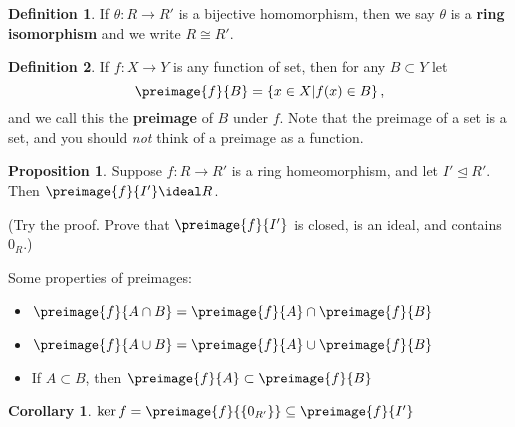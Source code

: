 \documentclass[a5paper]{article}
\theoremstyle{definition}%
\newtheorem*{corollary*}{Corollary}
\newtheorem*{proposition*}{Proposition}
\newtheorem*{definition*}{Definition}
\numberwithin{exercise}{section}
\theoremstyle{remark}%
\begin{document}
\begin{highlight}
\begin{definition*}
If $\theta:R\to R'$ is a bijective homomorphism, then we say $\theta$ is a \textbf{ring isomorphism} and we write $R\cong R'$. 
\end{definition*}
\end{highlight}

\begin{highlight}
\begin{definition*}
If $f:X \to Y$ is any function of set, then for any $B\subset Y$ let 
$$\preimage{f}{B}=\left\lbrace x \in X | f(x)\in B\right \rbrace,$$
and we call this the \textbf{preimage} of $B$ under $f$. Note that the preimage of a set is a set, and you should \emph{not} think of a preimage as a function. 
\end{definition*}
\end{highlight}

\begin{highlight}
\begin{proposition*}
Suppose $f:R\to R'$ is a ring homeomorphism, and let $I'\trianglelefteq R'$. Then $\preimage{f}{I'}\ideal R$. 
\end{proposition*}
\end{highlight}
(Try the proof. Prove that $\preimage{f}{I'}$ is closed, is an ideal, and contains $0_R$.) 

Some properties of preimages:
\begin{itemize}
\item $\preimage{f}{A\cap B}=\preimage{f}{A}\cap \preimage{f}{B}$
\item $\preimage{f}{A\cup B}=\preimage{f}{A}\cup \preimage{f}{B}$
\item If $A\subset B$, then $\preimage{f}{A}\subset \preimage{f}{B}$
\end{itemize}

\begin{highlight}
\begin{corollary*}
$\ker f = \preimage{f}{\{0_{R'}\}}\subseteq\preimage{f}{I'}$
\end{corollary*}
\end{highlight}
\end{document}
